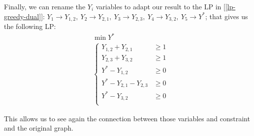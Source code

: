 \begin{ex}
    Finally, we can rename the $Y_i$ variables to adapt our result to the LP in [\ref{lp-greedy-dual}]: $Y_1 \rightarrow Y_{1,2}, \ Y_2 \rightarrow Y_{2,1}, \ Y_3 \rightarrow Y_{2,3}, \ Y_4 \rightarrow Y_{3,2}, \ Y_5 \rightarrow Y^*$; that gives us the following LP:
    \begin{equation*}
    \begin{aligned}
    &\min Y^*\\
    &\begin{cases}
    Y_{1,2} + Y_{2,1} &\geq 1\\
    Y_{2,3} + Y_{3,2} &\geq 1\\
    Y^* - Y_{1,2} &\geq 0\\
    Y^* - Y_{2,1} - Y_{2,3} &\geq 0\\
    Y^* - Y_{3,2} &\geq 0\\
    \end{cases}
    \end{aligned}
    \end{equation*}
    
    This allows us to see again the connection between those variables and constraint and the original graph.
\end{ex}




